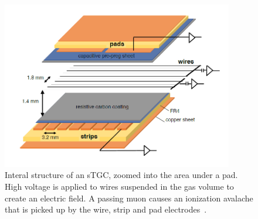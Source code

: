 \begin{figure}
    \centering
    \includegraphics[width = 0.9\textwidth]{figures/stgc_internals.png}
    \caption{Interal structure of an sTGC, zoomed into the area under a pad. High voltage is applied to wires suspended in the gas volume to create an electric field. A passing muon causes an ionization avalache that is picked up by the wire, strip and pad electrodes~\cite{lefebvre_precision_2020}.}
    \label{fig:stgc_internals}
\end{figure}

